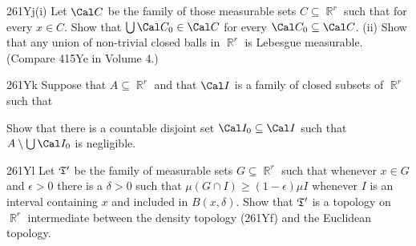 {\spheader 261Yj(i) Let $\Cal C$ be the family of those measurable sets 
$C\subseteq\BbbR^r$ such that 
for every $x\in C$. 
Show that $\bigcup\Cal C_0\in\Cal C$ for every $\Cal C_0\subseteq\Cal C$.
(ii) Show that any union of non-trivial closed balls in 
$\BbbR^r$ is Lebesgue measurable.   (Compare 
415Ye in Volume 4.) 
      
\spheader 261Yk Suppose that $A\subseteq\BbbR^r$ and that $\Cal I$ is a 
family of closed subsets of $\BbbR^r$ such that 
      
      
\noindent Show that there is a countable disjoint set 
$\Cal I_0\subseteq\Cal I$ such that 
$A\setminus\bigcup\Cal I_0$ is negligible. 
 
\spheader 261Yl Let $\frak T'$ be the family of measurable sets 
$G\subseteq\BbbR^r$ such that whenever $x\in G$ and $\epsilon>0$ 
there is a $\delta>0$ such that $\mu(G\cap I)\ge(1-\epsilon)\mu I$ whenever 
$I$ is an interval containing $x$ and included in $B(x,\delta)$.    
Show that  
$\frak T'$ is a topology on $\BbbR^r$ intermediate between the density 
topology (261Yf) and the Euclidean topology. 
}%
      
